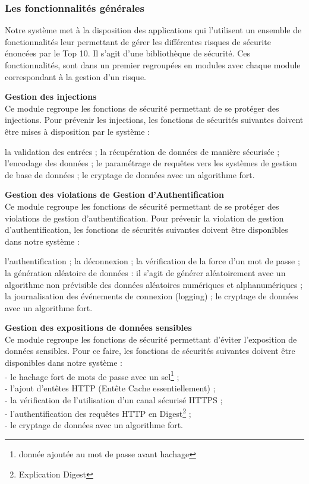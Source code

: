 \subsubsection{Les fonctionnalités générales}
Notre système met à la disposition des applications qui l'utilisent un ensemble de fonctionnalités leur permettant de gérer les différentes risques de sécurite énoncées par le Top 10. Il s'agit d'une bibliothèque de sécurité. Ces fonctionnalités, sont dans un premier regroupées en modules avec chaque module correspondant à la gestion d'un risque.

\textbf{\RIGHTarrow Gestion des injections}\\
Ce module regroupe les fonctions de sécurité permettant de se protéger des injections. Pour prévenir les injections, les fonctions de sécurités suivantes doivent être mises à disposition par le système : 
\begin{itemize}
	\itemcheck la validation des entrées ; 
	\itemcheck la récupération de données de manière sécurisée ; 
	\itemcheck l’encodage des données ; 
	\itemcheck le paramétrage de requêtes vers les systèmes de gestion de base de données ; 
	\itemcheck le cryptage de données avec un algorithme fort.\\
\end{itemize}

\textbf{\RIGHTarrow Gestion des violations de Gestion d’Authentification}\\
Ce module regroupe les fonctions de sécurité permettant de se protéger des violations de gestion d'authentification. Pour prévenir la violation de gestion d'authentification, les fonctions de sécurités suivantes doivent être disponibles dans notre système :
 \begin{itemize}
 	\itemcheck l'authentification ;
 	\itemcheck la déconnexion ;
 	\itemcheck la vérification de la force d'un mot de passe ; 
 	\itemcheck la génération aléatoire de données : il s'agit de générer aléatoirement avec un algorithme non prévisible des données aléatoires numériques et alphanumériques ; 
 	\itemcheck la journalisation des événements de connexion (logging) ; 
 	\itemcheck le cryptage de données avec un algorithme fort.\\
 \end{itemize}


\textbf{\RIGHTarrow Gestion des expositions de données sensibles}\\
Ce module regroupe les fonctions de sécurité permettant d'éviter l'exposition de données sensibles. Pour ce faire, les fonctions de sécurités suivantes doivent être disponibles dans notre système : \\
- le hachage fort de mots de passe avec un sel\footnote{donnée ajoutée au mot de passe avant hachage} ; \\
- l'ajout d'entêtes HTTP (Entête Cache essentiellement) ; \\
- la vérification de l'utilisation d'un canal sécurisé HTTPS ; \\
- l'authentification des requêtes HTTP en Digest\footnote{Explication Digest} ; \\
- le cryptage de données avec un algorithme fort.\\

